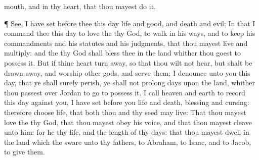 {mouth, and in thy
heart, that thou mayest
do it.
\par }{\PP {}¶
See, I have
set
before thee this
day
life and
good, and
death and
evil;
In that I
command thee this
day to
love the
{} thy
God, to
walk in his
ways, and to
keep his
commandments and his
statutes and his
judgments, that thou mayest
live and
multiply: and the
{} thy
God shall
bless thee in the
land whither thou
goest to
possess it.
But if thine
heart turn
away, so that thou wilt not
hear, but shalt be drawn
away, and
worship
other
gods, and
serve them;
I
denounce unto you this
day, that ye shall
surely
perish,
{} ye shall not
prolong
{}
days upon the
land, whither thou passest
over
Jordan to
go to
possess it.
I
call
heaven and
earth to
record this
day against you,
{} I have
set
before you
life and
death,
blessing and
cursing: therefore
choose
life, that both thou and thy
seed may
live:
That thou mayest
love the
{} thy
God,
{} that thou mayest
obey his
voice, and that thou mayest
cleave unto him: for he
{} thy
life, and the
length of thy
days: that thou mayest
dwell in the
land which the
{}
sware unto thy
fathers, to
Abraham, to
Isaac, and to
Jacob, to
give them.

}
